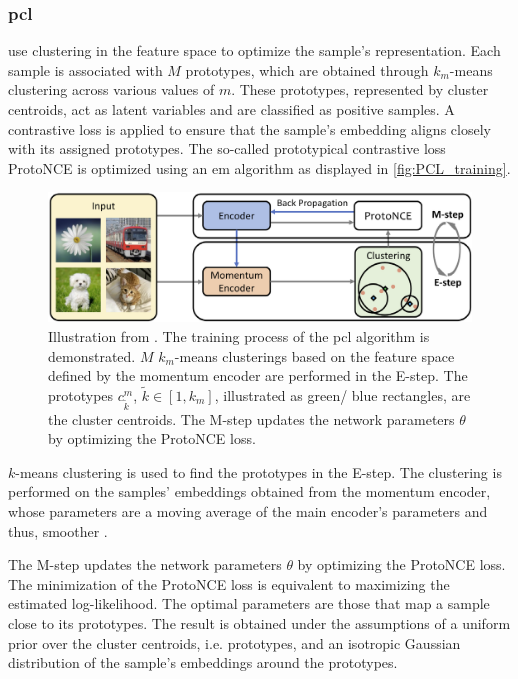 \subsubsection{\acl{pcl}}\label{subsec:PCL}

\citet{PCL_2021} use clustering in the feature space to optimize the sample's representation.
Each sample is associated with $M$ prototypes, which are obtained through $k_m$-means clustering across various values of $m$.
These prototypes, represented by cluster centroids, act as latent variables and are classified as positive samples. 
A contrastive loss is applied to ensure that the sample's embedding aligns closely with its assigned prototypes.
The so-called prototypical contrastive loss ProtoNCE is optimized using an \ac{em} algorithm 
as displayed in \autoref{fig:PCL_training}.

\begin{figure}[!htb] %
    \centering
    \includegraphics[width=360pt]{images/PCL_training.png}
    \caption{Illustration from \citet{PCL_2021}.
    The training process of the \ac{pcl} algorithm is demonstrated.
    $M$ $k_m$-means clusterings based on the feature space defined by the momentum encoder 
    are performed in the E-step.
    The prototypes $c^m_{\tilde{k}}$, $\tilde{k} \in [1, k_m]$, illustrated as green/ blue rectangles, 
    are the cluster centroids.
    The M-step updates the network parameters $\theta$ by optimizing the ProtoNCE loss.
    }
    \label{fig:PCL_training}
\end{figure}

$k$-means clustering is used to find the prototypes in the E-step.
The clustering is performed on the samples' embeddings obtained from the momentum encoder, 
whose parameters are a moving average of the main encoder's parameters and thus, smoother \citep{PCL_2021}.

The M-step updates the network parameters $\theta$ by optimizing the ProtoNCE loss.
The minimization of the ProtoNCE loss is equivalent to maximizing the estimated log-likelihood.
The optimal parameters are those that map a sample close to its prototypes.
The result is obtained under the assumptions of a uniform prior over the cluster centroids, i.e. prototypes,
and an isotropic Gaussian distribution of the sample's embeddings around the prototypes.

